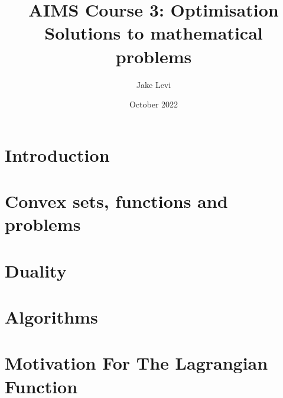 \documentclass{article}
\title{
    AIMS Course 3: Optimisation \\
    \large Solutions to mathematical problems
}
\author{Jake Levi}
\date{October 2022}
\begin{document}
\maketitle
\section{Introduction} \label{section:intro}

\section{Convex sets, functions and problems}

\section{Duality}

\section{Algorithms}



\appendix
\section{Motivation For The Lagrangian Function}\label{appendix:why lagrangian}

\end{document}
